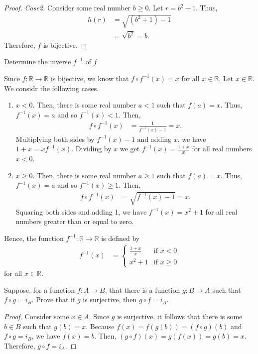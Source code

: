 \documentclass[12pt]{article}
\newcommand{\R}{\mathbb{R}}
\newenvironment{problem}[2][Problem]{\begin{trivlist} \item[\hskip \labelsep {\bfseries #1}\hskip \labelsep {\bfseries #2.}]}{\end{trivlist}}
\newenvironment{solution}[1][Solution]{\begin{trivlist} \item[\hskip \labelsep {\bfseries #1}]}{\end{trivlist}}
\begin{document}
\begin{problem}{57}
\begin{enumerate}
\begin{proof}
    \textit{Case2.} Consider some real number $b\geq 0$. Let $r=b^{2}+1$. Thus,
    \begin{align*}
      h(r) &= \sqrt{(b^{2}+1)-1}\\
      &= \sqrt{b^{2}} = b.
    \end{align*}
    Therefore, $f$ is bijective.
    \end{proof}
      \item Determine the inverse $f^{-1}$ of $f$
    \begin{solution}
      Since $f:\R\to \R$ is bijective, we know that $f\circ f^{-1}(x)=x$ for all $x\in \R$. Let $x\in \R$. We considr the following cases.
	\begin{enumerate}[label=Case\arabic*]
	  \item $x<0$. Then, there is some real number $a<1$ such that $f(a)=x$. Thus, $f^{-1}(x)=a$ and so $f^{-1}(x)<1$. Then, 
    \begin{align*}
      f\circ f^{-1}(x) &= \frac{1}{f^{-1}(x)-1} = x.
    \end{align*}
    Multiplying both sides by $f^{-1}(x)-1$ and adding $x$. we have $1+x=xf^{-1}(x)$. Dividing by $x$ we get $f^{-1}(x) = \frac{1+x}{x}$ for all real numbers $x<0$.
  \item $x\geq 0$. Then, there is some real number $a\geq 1$ such that $f(a)=x$. Thus, $f^{-1}(x)=a$ and so $f^{-1}(x)\geq 1$. Then,
    \begin{align*}
      f\circ f^{-1}(x) &= \sqrt{f^{-1}(x)-1} = x.
    \end{align*}
    Squaring both sides and adding 1, we have $f^{-1}(x) = x^{2}+1$ for all real numbers greater than or equal to zero. 
    \end{enumerate}
    Hence, the function $f^{-1}:\R\to \R$ is defined by 
    \begin{align*}
      f^{-1}(x) &= 
    \begin{cases}
      \frac{1+x}{x} &\text{if }x<0\\
      x^{2}+1 &\text{if }x\geq 0
    \end{cases}
    \end{align*}
    for all $x\in \R$.
    \end{solution}
    \end{enumerate}
    \end{problem}
    \begin{problem}{58}
      Suppose, for a function $f:A\to B$, that there is a function $g:B\to A$ such that $f\circ g = i_{B}$. Prove that if $g$ is surjective, then $g\circ f = i_{A}$.
    \begin{proof}
      Consider some $x\in A$. Since $g$ is surjective, it follows that there is some $b\in B$ such that $g(b) =x$. Because $f(x) = f(g(b)) = (f\circ g)(b)$ and $f\circ g = i_{B}$, we have $f(x) = b$. Then, $ (g\circ f)(x) = g(f(x))= g(b) = x$. Therefore, $g\circ f = i_{A}$.  
    \end{proof}
    \end{problem}
\end{document}
